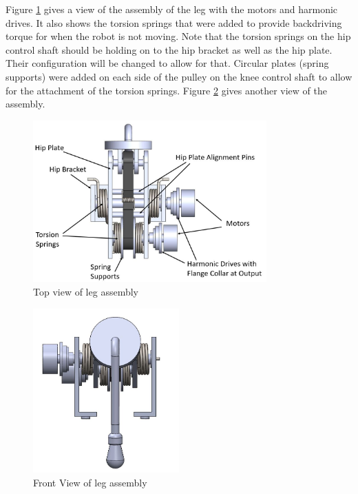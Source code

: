 Figure \ref{fig:leg_top} gives a view of the assembly of the leg with the motors and harmonic drives. It also shows the torsion springs that were added to provide backdriving torque for when the robot is not moving. Note that the torsion springs on the hip control shaft should be holding on to the hip bracket as well as the hip plate. Their configuration will be changed to allow for that. Circular plates (spring supports) were added on each side of the pulley on the knee control shaft to allow for the attachment of the torsion springs.
Figure \ref{fig:leg_front} gives another view of the assembly.

\begin{figure}
    \centering
    \includegraphics[width=0.8\textwidth]{2_DetailedDesign/img/LegTopView_a.JPG}
    \caption{Top view of leg assembly}
    \label{fig:leg_top}
\end{figure}

\begin{figure}
    \centering
    \includegraphics[width=0.5\textwidth]{2_DetailedDesign/img/LegFrontView.JPG}
    \caption{Front View of leg assembly}
    \label{fig:leg_front}
\end{figure}

